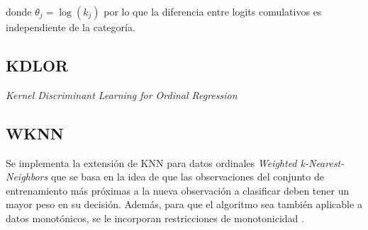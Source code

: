 donde $\theta_j=\log(k_j)$ por lo que la diferencia entre logits comulativos es independiente de la categoría.

\subsection{KDLOR}
\textit{Kernel Discriminant Learning for Ordinal Regression}  \cite{sun2010kernel}
\subsection{WKNN}
Se implementa la extensión de KNN para datos ordinales 
\textit{Weighted k-Nearest-Neighbors} \cite{hechenbichler2004weighted} que se basa en la idea de que las observaciones del conjunto de entrenamiento más próximas a la nueva observación a clasificar deben tener un mayor peso en su decisión. Además, para que el algoritmo sea también aplicable a datos monotónicos, se le incorporan restricciones de monotonicidad \cite{duivesteijn2008nearest}.

